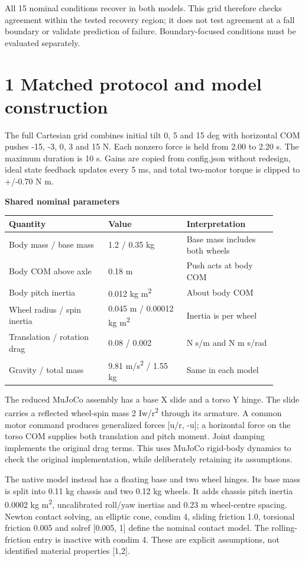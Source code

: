 \documentclass[11pt,a4paper]{article}
\begin{document}
All 15 nominal conditions recover in both models. This grid therefore checks agreement within the tested recovery region; it does not test agreement at a fall boundary or validate prediction of failure. Boundary-focused conditions must be evaluated separately.

\clearpage
\section*{1 Matched protocol and model construction}
The full Cartesian grid combines initial tilt 0, 5 and 15 deg with horizontal COM pushes -15, -3, 0, 3 and 15 N. Each nonzero force is held from 2.00 to 2.20 s. The maximum duration is 10 s. Gains are copied from config.json without redesign, ideal state feedback updates every 5 ms, and total two-motor torque is clipped to +/-0.70 N m.

\textbf{Shared nominal parameters}
\begin{longtable}{p{0.333\linewidth}p{0.261\linewidth}p{0.306\linewidth}}
\toprule
Quantity & Value & Interpretation \\ \midrule \endhead
Body mass / base mass & 1.2 / 0.35 kg & Base mass includes both wheels \\
Body COM above axle & 0.18 m & Push acts at body COM \\
Body pitch inertia & 0.012 kg m\textsuperscript{2} & About body COM \\
Wheel radius / spin inertia & 0.045 m / 0.00012 kg m\textsuperscript{2} & Inertia is per wheel \\
Translation / rotation drag & 0.08 / 0.002 & N s/m and N m s/rad \\
Gravity / total mass & 9.81 m/s\textsuperscript{2} / 1.55 kg & Same in each model \\
\bottomrule
\end{longtable}
The reduced MuJoCo assembly has a base X slide and a torso Y hinge. The slide carries a reflected wheel-spin mass 2 Iw/r\textsuperscript{2} through its armature. A common motor command produces generalized forces [u/r, -u]; a horizontal force on the torso COM supplies both translation and pitch moment. Joint damping implements the original drag terms. This uses MuJoCo rigid-body dynamics to check the original implementation, while deliberately retaining its assumptions.

The native model instead has a floating base and two wheel hinges. Its base mass is split into 0.11 kg chassis and two 0.12 kg wheels. It adds chassis pitch inertia 0.0002 kg m\textsuperscript{2}, uncalibrated roll/yaw inertias and 0.23 m wheel-centre spacing. Newton contact solving, an elliptic cone, condim 4, sliding friction 1.0, torsional friction 0.005 and solref [0.005, 1] define the nominal contact model. The rolling-friction entry is inactive with condim 4. These are explicit assumptions, not identified material properties [1,2].
\end{document}
